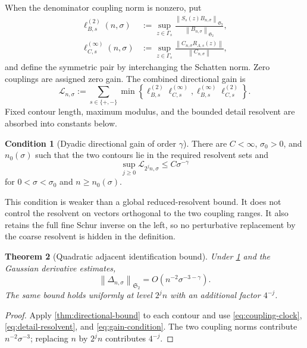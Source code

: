 \documentclass[11pt]{article}
\newtheorem{theorem}{Theorem}[section]
\theoremstyle{definition}
\newtheorem{condition}[theorem]{Condition}
\theoremstyle{remark}
\newcommand{\cL}{\mathcal L}
\newcommand{\HS}{\mathfrak S_2}
\newcommand{\norm}[1]{\left\lVert #1\right\rVert}
\begin{document}
When the denominator coupling norm is nonzero, put
\begin{align}
 \ell_{B,s}^{(2)}(n,\sigma)
 &:=\sup_{z\in\Gamma_s}
 \frac{\norm{S_s(z)B_{n,\sigma}}_{\HS}}
 {\norm{B_{n,\sigma}}_{\HS}},
 \label{eq:normalized-left-hs}\\
 \ell_{C,s}^{(\infty)}(n,\sigma)
 &:=\sup_{z\in\Gamma_s}
 \frac{\norm{C_{n,\sigma}R_{A,s}(z)}}
 {\norm{C_{n,\sigma}}},
 \label{eq:normalized-right-op}
\end{align}
and define the symmetric pair by interchanging the Schatten norm.  Zero
couplings are assigned zero gain.  The combined directional gain is
\begin{equation}
 \cL_{n,\sigma}
 :=\sum_{s\in\{+,-\}}
 \min\!\left\{
 \ell_{B,s}^{(2)}\ell_{C,s}^{(\infty)},
 \ell_{B,s}^{(\infty)}\ell_{C,s}^{(2)}
 \right\}.
 \label{eq:combined-gain}
\end{equation}
Fixed contour length, maximum modulus, and the bounded detail resolvent are
absorbed into constants below.

\begin{condition}[Dyadic directional gain of order $\gamma$]
\label{cond:directional-gain}
There are $C<\infty$, $\sigma_0>0$, and $n_0(\sigma)$ such that the two
contours lie in the required resolvent sets and
\begin{equation}
 \sup_{j\ge0}\cL_{2^jn,\sigma}
 \le C\sigma^{-\gamma}
 \label{eq:gain-condition}
\end{equation}
for $0<\sigma<\sigma_0$ and $n\ge n_0(\sigma)$.
\end{condition}

This condition is weaker than a global reduced-resolvent bound.  It does not
control the resolvent on vectors orthogonal to the two coupling ranges.  It
also retains the full fine Schur inverse on the left, so no perturbative
replacement by the coarse resolvent is hidden in the definition.

\begin{theorem}[Quadratic adjacent identification bound]
\label{thm:adjacent-bound}
Under \cref{cond:directional-gain} and the Gaussian derivative estimates,
\begin{equation}
 \norm{\Delta_{n,\sigma}}_{\HS}
 =O(n^{-2}\sigma^{-3-\gamma}).
 \label{eq:adjacent-small-noise}
\end{equation}
The same bound holds uniformly at level $2^jn$ with an additional factor
$4^{-j}$.
\end{theorem}

\begin{proof}
Apply \cref{thm:directional-bound} to each contour and use
\eqref{eq:coupling-clock}, \eqref{eq:detail-resolvent}, and
\eqref{eq:gain-condition}.  The two coupling norms contribute
$n^{-2}\sigma^{-3}$; replacing $n$ by $2^jn$ contributes $4^{-j}$.
\end{proof}
\end{document}
